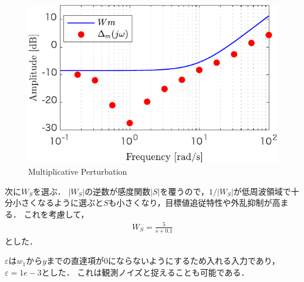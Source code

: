\begin{figure}[t]
    \centering
        \includegraphics[keepaspectratio, scale=1.0]{contents/Appendix_Hinfty/figure/Wmanddeltam-crop.pdf}
        \caption{Multiplicative Perturbation}
        \label{fig:Wmanddeltam-crop}
\end{figure}

次に$W_S$を選ぶ．
$|W_S|$の逆数が感度関数$|S|$を覆うので，$1/|W_S|$が低周波領域で十分小さくなるように選ぶと$S$も小さくなり，目標値追従特性や外乱抑制が高まる．
これを考慮して，
\begin{align}
    W_S = \frac{5}{s+0.1}
\end{align}
とした．

$\varepsilon$は$w_1$から$y$までの直達項が0にならないようにするため入れる入力であり，$\varepsilon = 1e-3$とした．
これは観測ノイズと捉えることも可能である．

